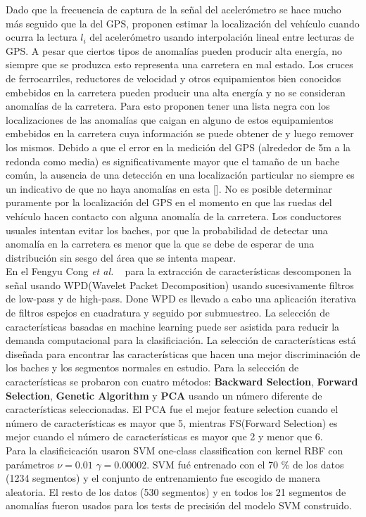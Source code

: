Dado que la frecuencia de captura de la señal del acelerómetro se hace mucho más seguido que la del GPS, proponen estimar la localización del vehículo
cuando ocurra la lectura $l_i$ del acelerómetro usando interpolación lineal entre lecturas de GPS. A pesar que ciertos tipos de anomalías pueden producir
alta energía, no siempre que se produzca esto representa una carretera en mal estado. Los cruces de ferrocarriles, reductores de velocidad y otros
equipamientos bien conocidos embebidos en la carretera pueden producir una alta energía y no se consideran anomalías de la carretera. Para esto proponen
tener una lista negra con los localizaciones de las anomalías que caigan en alguno de estos equipamientos embebidos en la carretera cuya información se
puede obtener de y luego remover los mismos. Debido a que el error en la medición del GPS (alrededor de 5m a la redonda como media) es significativamente
mayor que el tamaño de un bache común, la ausencia de una detección en una localización particular no siempre es un indicativo de que no haya anomalías en
esta []. No es posible determinar puramente por la localización del GPS en el momento en que las ruedas del vehículo hacen contacto con alguna anomalía de
la carretera. Los conductores usuales intentan evitar los baches, por que la probabilidad de detectar una anomalía en la carretera es menor que la que se
debe de esperar de una distribución sin sesgo del área que se intenta mapear.\\

En el Fengyu Cong {\it et al.} ~\cite{cong2013applying} para la extracción de características descomponen la señal usando WPD(Wavelet Packet Decomposition) usando sucesivamente filtros de low-pass y de high-pass.
Done WPD es llevado a cabo una aplicación iterativa de filtros espejos en cuadratura y seguido por submuestreo. La selección de características basadas 
en machine learning puede ser asistida para reducir la demanda computacional para la clasificiación. La selección de características está diseñada para
encontrar las características que hacen una mejor discriminación de los baches y los segmentos normales en estudio. 
Para la selección de características se probaron con cuatro métodos: \textbf{Backward Selection}, \textbf{Forward Selection}, \textbf{Genetic Algorithm} y
\textbf{PCA} usando un número diferente de características seleccionadas. El PCA fue el mejor feature selection cuando el número de características es mayor 
que 5, mientras FS(Forward Selection) es mejor cuando el número de características es mayor que 2 y menor que 6.
\\
Para la clasificicación usaron SVM one-class classification con kernel RBF con parámetros  $\nu = 0.01$  $\gamma = 0.00002$. SVM fué entrenado con el 70 \%  de los datos 
(1234 segmentos) y el conjunto de entrenamiento fue escogido de manera aleatoria. El resto de los datos  (530 segmentos) y en todos los 21 segmentos de anomalías fueron 
usados para los tests de precisión del modelo SVM construido. 

